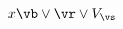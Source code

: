 \documentclass[10pt]{scrartcl}
\begin{document}
\Huge
\makeatletter
\[
    x
    \vb\lor\vr\lor V_\vs
\]
\ExplSyntaxOn
\end{document}
